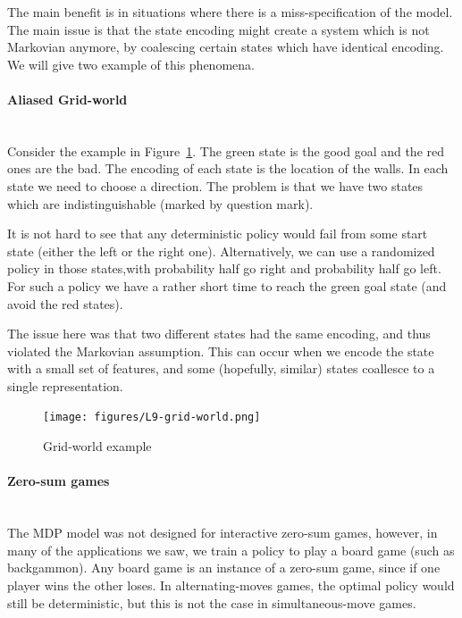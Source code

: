 The main benefit is in situations where there is a
miss-specification of the model. The main issue is that the state
encoding might create a system which is not Markovian anymore, by
coalescing certain states which have identical encoding. We will
give two example of this phenomena.

\paragraph{Aliased Grid-world}\ \\
Consider the example in Figure~\ref{fig:L9-grid-world}. The green
state is the good goal and the red ones are the bad. The encoding of
each state is the location of the walls. In each state we need to
choose a direction. The problem is that we have two states which are
indistinguishable (marked by question mark).

It is not hard to see that any deterministic policy would fail from
some start state (either the left or the right one). Alternatively,
we can use a randomized policy in those states,with probability half
go right and probability half go left. For such a policy we have a
rather short time to reach the green goal state (and avoid the red
states).

The issue here was that two different states had the same encoding,
and thus violated the Markovian assumption. This can occur when we
encode the state with a small set of features, and some (hopefully,
similar) states coallesce to a single representation.

\begin{figure}
  \begin{centering}
  \texttt{[image: figures/L9-grid-world.png]}\\
  \caption{Grid-world example }\label{fig:L9-grid-world}
  \end{centering}
\end{figure}

\paragraph{Zero-sum games}\ \\
The MDP model was not designed for interactive zero-sum games,
however, in many of the applications we saw, we train a policy to
play a board game (such as backgammon). Any board game is an
instance of a zero-sum game, since if one player wins the other
loses. In alternating-moves games, the optimal policy would still be
deterministic, but this is not the case in simultaneous-move games.

